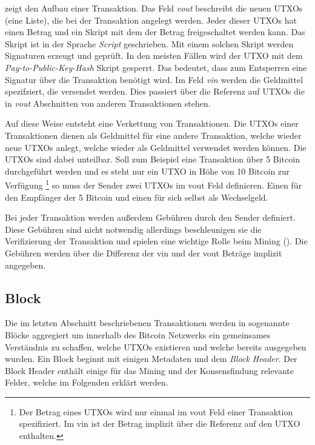 \documentclass[ngerman,runningheads,a4paper]{llncs}[2018/03/10]
\begin{document}
 zeigt den Aufbau einer Transaktion. Das Feld \textit{vout} beschreibt die neuen UTXOs (eine Liste), die bei der Transaktion angelegt werden. Jeder dieser UTXOs hat einen Betrag und ein Skript mit dem der Betrag freigeschaltet werden kann. Das Skript ist in der Sprache \textit{Script} geschrieben. Mit einem solchen Skript werden Signaturen erzeugt und geprüft. In den meisten Fällen wird der UTXO mit dem \textit{Pay-to-Public-Key-Hash} \citep{bitcoinbook} Skript gesperrt. Das bedeutet, dass zum Entsperren eine Signatur über die Transaktion benötigt wird.  Im Feld \textit{vin} werden die Geldmittel spezifziert, die versendet werden. Dies passiert über die Referenz auf UTXOs die in \textit{vout} Abschnitten von anderen Transaktionen stehen.

Auf diese Weise entsteht eine Verkettung von Transaktionen. Die UTXOs einer Transaktionen dienen als Geldmittel für eine andere Transaktion, welche wieder neue UTXOs anlegt, welche wieder als Geldmittel verwendet werden können. Die UTXOs sind dabei unteilbar. Soll zum Beispiel eine Transaktion über 5 Bitcoin durchgeführt werden und es steht nur ein UTXO in Höhe von 10 Bitcoin zur Verfügung \footnote{Der Betrag eines UTXOs wird nur einmal im vout Feld einer Transaktion spezifiziert. Im vin ist der Betrag implizit über die Referenz auf den UTXO enthalten.} so muss der Sender zwei UTXOs im vout Feld definieren. Einen für den Empfänger der 5 Bitcoin und einen für sich selbst als Wechselgeld.

Bei jeder Transaktion werden außerdem Gebühren durch den Sender definiert. Diese Gebühren sind nicht notwendig allerdings beschleunigen sie die Verifizierung der Transaktion und spielen eine wichtige Rolle beim Mining (). Die Gebühren werden über die Differenz der vin und der vout Beträge implizit angegeben.

\subsection{Block}\label{sec:block}

Die im letzten Abschnitt beschriebenen Transaktionen werden in sogenannte Blöcke aggregiert um innerhalb des Bitcoin Netzwerks ein gemeinsames Verständnis zu schaffen, welche UTXOs existieren und welche bereits ausgegeben wurden. Ein Block beginnt mit einigen Metadaten und dem \textit{Block Header}. Der Block Header enthält einige für das Mining und der Konsensfindung relevante Felder, welche im Folgenden erklärt werden.
\end{document}

